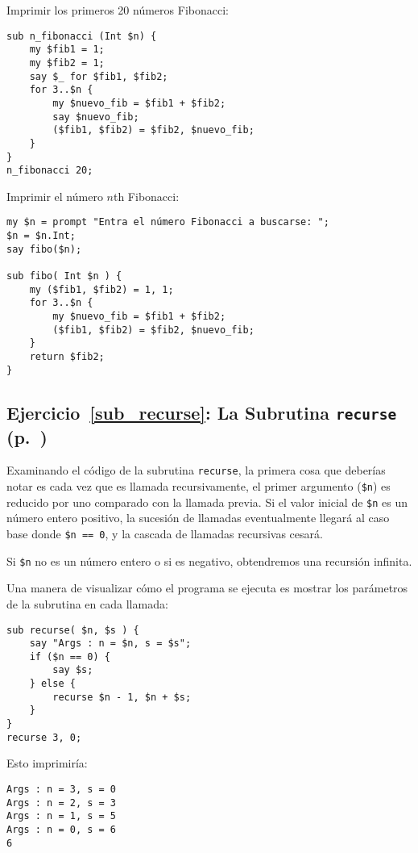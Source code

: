 Imprimir los primeros 20 números Fibonacci:

\begin{verbatim}
sub n_fibonacci (Int $n) {
    my $fib1 = 1;
    my $fib2 = 1;
    say $_ for $fib1, $fib2;
    for 3..$n {
        my $nuevo_fib = $fib1 + $fib2;
        say $nuevo_fib;
        ($fib1, $fib2) = $fib2, $nuevo_fib;
    }
}
n_fibonacci 20;
\end{verbatim}

Imprimir el número $n$th Fibonacci:

\begin{verbatim}
my $n = prompt "Entra el número Fibonacci a buscarse: ";
$n = $n.Int;
say fibo($n);

sub fibo( Int $n ) {
    my ($fib1, $fib2) = 1, 1;
    for 3..$n {
        my $nuevo_fib = $fib1 + $fib2;
        ($fib1, $fib2) = $fib2, $nuevo_fib;
    }
    return $fib2;
}    
\end{verbatim}


\subsection{Ejercicio~\ref{sub_recurse}: La Subrutina {\tt recurse} (p.~\pageref{sub_recurse})}
\label{sol_sub_recurse}

Examinando el código de la subrutina {\tt recurse}, 
la primera cosa que deberías notar es cada vez que es llamada
recursivamente, el primer argumento (\verb|$n|) es reducido por
uno comparado con la llamada previa. Si el valor inicial de \verb|$n|
es un número entero positivo, la sucesión de llamadas eventualmente
llegará al caso base donde \verb|$n == 0|, y la cascada de llamadas
recursivas cesará.

Si \verb|$n| no es un número entero o si es negativo, obtendremos una
recursión infinita.

Una manera de visualizar cómo el programa se ejecuta es mostrar
los parámetros de la subrutina en cada llamada:

\begin{verbatim}
sub recurse( $n, $s ) {
    say "Args : n = $n, s = $s";
    if ($n == 0) {
        say $s;
    } else {
        recurse $n - 1, $n + $s;
    }
}
recurse 3, 0;
\end{verbatim}
Esto imprimiría:
\begin{verbatim}
Args : n = 3, s = 0
Args : n = 2, s = 3
Args : n = 1, s = 5
Args : n = 0, s = 6
6
\end{verbatim}

